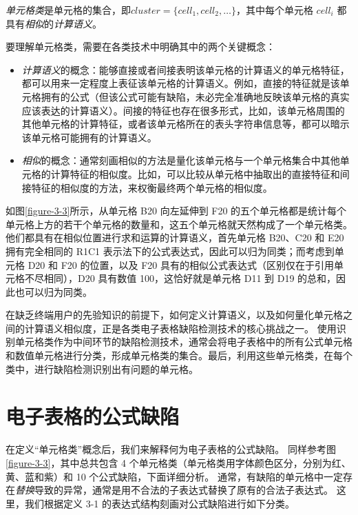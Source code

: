 \begin{definition}
    \textit{单元格类}是单元格的集合，即$cluster = \{cell_1, cell_2, \dots\}$，其中每个单元格 $cell_i$ 都具有\textit{相似}的\textit{计算语义}。
\end{definition}

要理解单元格类，需要在各类技术中明确其中的两个关键概念：

\begin{itemize}
    \item \textit{计算语义}的概念：能够直接或者间接表明该单元格的计算语义的单元格特征，都可以用来一定程度上表征该单元格的计算语义。例如，直接的特征就是该单元格拥有的公式（但该公式可能有缺陷，未必完全准确地反映该单元格的真实应该表达的计算语义）。间接的特征也存在很多形式，比如，该单元格周围的其他单元格的计算特征，或者该单元格所在的表头字符串信息等，都可以暗示该单元格可能拥有的计算语义。
    \item \textit{相似}的概念：通常刻画相似的方法是量化该单元格与一个单元格集合中其他单元格的计算特征的相似度。比如，可以比较从单元格中抽取出的直接特征和间接特征的相似度的方法，来权衡最终两个单元格的相似度。
\end{itemize}

如图\ref{figure-3-3}所示，从单元格 B20 向左延伸到 F20 的五个单元格都是统计每个单元格上方的若干个单元格的数量和，这五个单元格就天然构成了一个单元格类。他们都具有在相似位置进行求和运算的计算语义，首先单元格 B20、C20 和 E20 拥有完全相同的 R1C1 表示法下的公式表达式，因此可以归为同类；而考虑到单元格 D20 和 F20 的位置，以及 F20 具有的相似公式表达式（区别仅在于引用单元格不尽相同），D20 具有数值 100，这恰好就是单元格 D11 到 D19 的总和，因此也可以归为同类。

在缺乏终端用户的先验知识的前提下，如何定义计算语义，以及如何量化单元格之间的计算语义相似度，正是各类电子表格缺陷检测技术的核心挑战之一\cite{Barowy2018excelint}。
使用识别单元格类作为中间环节的缺陷检测技术，通常会将电子表格中的所有公式单元格和数值单元格进行分类，形成单元格类的集合。最后，利用这些单元格类，在每个类中，进行缺陷检测识别出有问题的单元格。


\section{电子表格的公式缺陷}
在定义“单元格类”概念后，我们来解释何为电子表格的公式缺陷。
同样参考图\ref{figure-3-3}，其中总共包含 4 个单元格类（单元格类用字体颜色区分，分别为红、黄、蓝和紫）和 10 个公式缺陷，下面详细分析。
通常，有缺陷的单元格中一定存在\textit{替换}导致的异常，通常是用不合法的子表达式替换了原有的合法子表达式。
这里，我们根据定义 3-1 的表达式结构刻画对公式缺陷进行如下分类。

